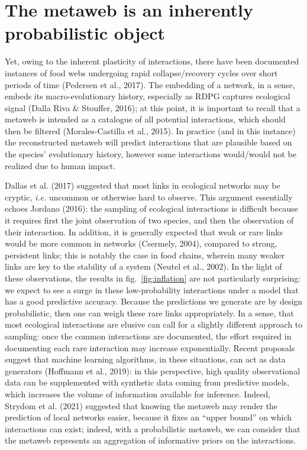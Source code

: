 \documentclass[11pt]{article}
\begin{document}
\hypertarget{the-metaweb-is-an-inherently-probabilistic-object}{%
\section{The metaweb is an inherently probabilistic
object}\label{the-metaweb-is-an-inherently-probabilistic-object}}

Yet, owing to the inherent plasticity of interactions, there have been
documented instances of food webs undergoing rapid collapse/recovery
cycles over short periods of time (Pedersen et al., 2017). The embedding
of a network, in a sense, embeds its macro-evolutionary history,
especially as RDPG captures ecological signal (Dalla Riva \& Stouffer,
2016); at this point, it is important to recall that a metaweb is
intended as a catalogue of all potential interactions, which should then
be filtered (Morales-Castilla et al., 2015). In practice (and in this
instance) the reconstructed metaweb will predict interactions that are
plausible based on the species' evolutionary history, however some
interactions would/would not be realized due to human impact.

Dallas et al. (2017) suggested that most links in ecological networks
may be cryptic, \emph{i.e.} uncommon or otherwise hard to observe. This
argument essentially echoes Jordano (2016): the sampling of ecological
interactions is difficult because it requires first the joint
observation of two species, and then the observation of their
interaction. In addition, it is generally expected that weak or rare
links would be more common in networks (Csermely, 2004), compared to
strong, persistent links; this is notably the case in food chains,
wherein many weaker links are key to the stability of a system (Neutel
et al., 2002). In the light of these observations, the results in
fig.~\ref{fig:inflation} are not particularly surprising: we expect to
see a surge in these low-probability interactions under a model that has
a good predictive accuracy. Because the predictions we generate are by
design probabilistic, then one can weigh these rare links appropriately.
In a sense, that most ecological interactions are elusive can call for a
slightly different approach to sampling: once the common interactions
are documented, the effort required in documenting each rare interaction
may increase exponentially. Recent proposals suggest that machine
learning algorithms, in these situations, can act as data generators
(Hoffmann et al., 2019): in this perspective, high quality observational
data can be supplemented with synthetic data coming from predictive
models, which increases the volume of information available for
inference. Indeed, Strydom et al. (2021) suggested that knowing the
metaweb may render the prediction of local networks easier, because it
fixes an ``upper bound'' on which interactions can exist; indeed, with a
probabilistic metaweb, we can consider that the metaweb represents an
aggregation of informative priors on the interactions.
\end{document}
